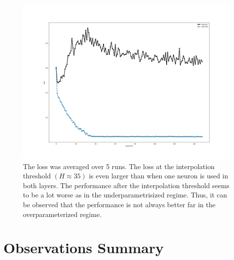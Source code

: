 \begin{figure}[!htp]
\centering
\includegraphics[width= 1\linewidth]{Abschlussarbeit_2021/LaTeX/images/double_descent_regression.png}
\caption{The loss was averaged over 5 runs. The loss at the interpolation threshold $(H \approx 35)$ is even larger than when one neuron is used in both layers. The performance after the interpolation threshold seems to be a lot worse as in the underparametrisized regime. Thus, it can be observed that the performance is not always better far in the overparameterized regime.}
\label{fig:double_descent_wine}
\end{figure}

\section{Observations Summary}

